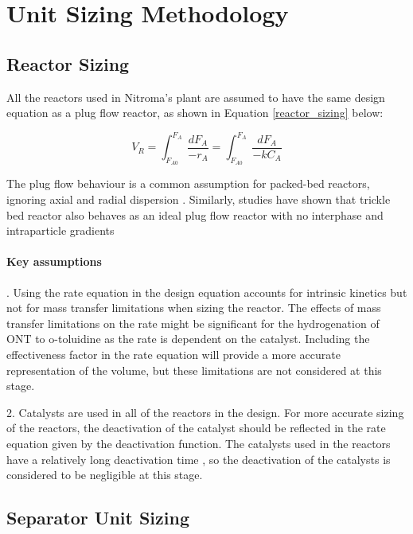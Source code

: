 \section{Unit Sizing Methodology}
\label{app:sizing}
\subsection{Reactor Sizing}

All the reactors used in Nitroma's plant are assumed to have the same design equation as a plug flow reactor, as shown in Equation \ref{reactor_sizing} below:

\begin{equation}
    V_R = \int_{F_{A0}}^{F_{A}} \frac{dF_A}{-r_A} = \int_{F_{A0}}^{F_{A}} \frac{dF_A}{-kC_A}
    \label{reactor_sizing}
\end{equation}

The plug flow behaviour is a common assumption for packed-bed reactors, ignoring axial and radial dispersion \cite{froment_chemical_nodate}. Similarly, studies have shown that  trickle bed reactor also behaves as an ideal plug flow reactor with no interphase and intraparticle gradients \cite{p_a_ramachandran_recent_1987} 

\paragraph{Key assumptions}
 
.  Using the rate equation in the design equation accounts for intrinsic kinetics but not for mass transfer limitations when sizing the reactor. The effects of mass transfer limitations on the rate might be significant for the hydrogenation of ONT to o-toluidine as the rate is dependent on the catalyst. Including the effectiveness factor in the rate equation will provide a more accurate representation of the volume, but these limitations are not considered at this stage.

2.  Catalysts are used in all of the reactors in the design. For more accurate sizing of the reactors, the deactivation of the catalyst should be reflected in the rate equation given by the deactivation function. The catalysts used in the reactors have a relatively long deactivation time \cite{temizel_novel_2020}, so the deactivation of the catalysts is considered to be negligible at this stage. 

\subsection{Separator Unit Sizing}

